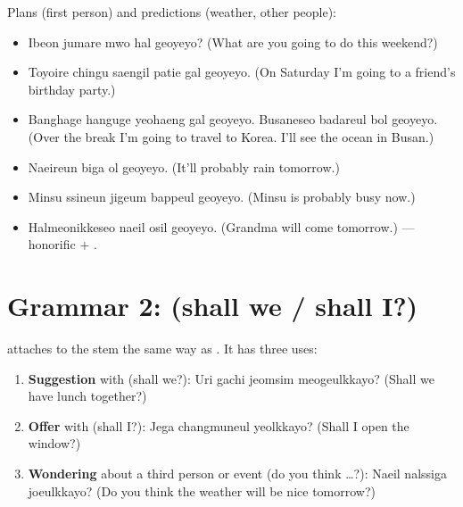 \begin{example}
Plans (first person) and predictions (weather, other people):
\begin{itemize}
  \item {} Ibeon jumare mwo hal geoyeyo? (What are you going
        to do this weekend?)
  \item {} Toyoire chingu saengil patie gal
        geoyeyo. (On Saturday I'm going to a friend's birthday party.)
  \item {} Banghage hanguge
        yeohaeng gal geoyeyo. Busaneseo badareul bol geoyeyo. (Over the break I'm going to
        travel to Korea. I'll see the ocean in Busan.)
  \item {} Naeireun biga ol geoyeyo. (It'll probably rain
        tomorrow.)
  \item {} Minsu ssineun jigeum bappeul geoyeyo. (Minsu is
        probably busy now.)
  \item {} Halmeonikkeseo naeil osil geoyeyo. (Grandma
        will come tomorrow.) --- honorific  + .
\end{itemize}
\end{example}

\section{Grammar 2:  (shall we / shall I?)}

 attaches to the stem the same way as . It has
three uses:
\begin{enumerate}
  \item \textbf{Suggestion} with  (shall we?): 
        Uri gachi jeomsim meogeulkkayo? (Shall we have lunch together?)
  \item \textbf{Offer} with  (shall I?):  Jega
        changmuneul yeolkkayo? (Shall I open the window?)
  \item \textbf{Wondering} about a third person or event (do you think \ldots?):
         Naeil nalssiga joeulkkayo? (Do you think the weather
        will be nice tomorrow?)
\end{enumerate}

